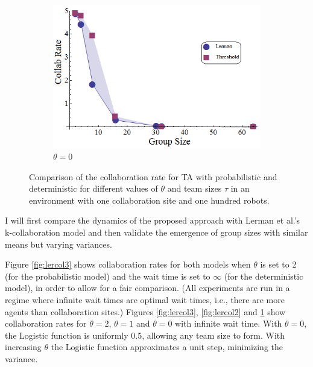 \documentclass[defaultstyle,12pt]{proposal}
\begin{document}
\begin{figure}[!htb]
\begin{subfigure}{0.33\textwidth}
\centering\includegraphics[width=1.0\textwidth]{../assets/LermanCollabCompare1.png}
\centering\caption{$\theta=0$}\label{fig:lercol1}
\end{subfigure}
\caption{Comparison of the collaboration rate for TA with probabilistic and deterministic \cite{Lerman2001} for different values of $\theta$ and team sizes $\tau$ in an environment with one collaboration site and one hundred robots. }\label{fig:lercol}
\end{figure}

I will first compare the dynamics of the proposed approach with Lerman et al.'s k-collaboration model \cite{Lerman2001} and then validate the emergence of group sizes with similar means but varying variances.

Figure \ref{fig:lercol3} shows collaboration rates for both models when $\theta$ is set to 2 (for the probabilistic model) and the wait time is set to $\infty$ (for the deterministic model), in order to allow for a fair comparison. (All experiments are run in a regime where infinite wait times are optimal wait times, i.e., there are more agents than collaboration sites.) Figures \ref{fig:lercol3}, \ref{fig:lercol2} and \ref{fig:lercol1} show collaboration rates for $\theta = 2$, $\theta = 1$ and $\theta=0$ with infinite wait time. With $\theta=0$, the Logistic function is uniformly 0.5, allowing any team size to form.  
With increasing $\theta$ the Logistic function approximates a unit step, minimizing the variance. 
\end{document}
